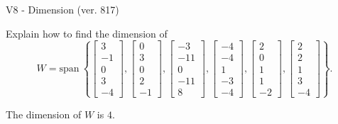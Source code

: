 \begin{exercise}
  \begin{exerciseTitle}V8 - Dimension (ver. 817)\end{exerciseTitle}
  \begin{exerciseStatement}
    Explain how to find the dimension of 
\[W=\mathrm{span}\ \left\{\left[\begin{array}{r}
3 \\
-1 \\
0 \\
3 \\
-4
\end{array}\right] , \left[\begin{array}{r}
0 \\
3 \\
0 \\
2 \\
-1
\end{array}\right] , \left[\begin{array}{r}
-3 \\
-11 \\
0 \\
-11 \\
8
\end{array}\right] , \left[\begin{array}{r}
-4 \\
-4 \\
1 \\
-3 \\
-4
\end{array}\right] , \left[\begin{array}{r}
2 \\
0 \\
1 \\
1 \\
-2
\end{array}\right] , \left[\begin{array}{r}
2 \\
2 \\
1 \\
3 \\
-4
\end{array}\right]\right\}.\]



  \end{exerciseStatement}
  \begin{exerciseAnswer}
   The dimension of \(W\) is  \(4\).
  


  \end{exerciseAnswer}
\end{exercise}